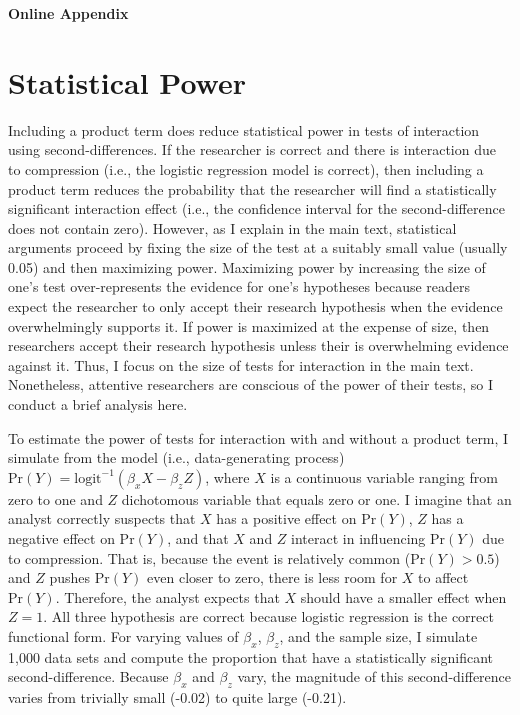 \documentclass[12pt]{article}
\begin{document}
\singlespace

%

\newpage
\begin{appendix}
\singlespace

\begin{center}
\LARGE{\textbf{Online Appendix}}\vspace{4mm}
\end{center}
\section{Statistical Power}

Including a product term does reduce statistical power in tests of interaction using second-differences. If the researcher is correct and there is interaction due to compression (i.e., the logistic regression model is correct), then including a product term reduces the probability that the researcher will find a statistically significant interaction effect (i.e., the confidence interval for the second-difference does not contain zero). However, as I explain in the main text, statistical arguments proceed by fixing the size of the test at a suitably small value (usually 0.05) and then maximizing power. Maximizing power by increasing the size of one's test over-represents the evidence for one's hypotheses because readers expect the researcher to only accept their research hypothesis when the evidence overwhelmingly supports it. If power is maximized at the expense of size, then researchers accept their research hypothesis unless their is overwhelming evidence against it. Thus, I focus on the size of tests for interaction in the main text. Nonetheless, attentive researchers are conscious of the power of their tests, so I conduct a brief analysis here.

To estimate the power of tests for interaction with and without a product term, I simulate from the model (i.e., data-generating process) $\text{Pr}(Y) = \text{logit}^{-1}(\beta_xX - \beta_zZ)$, where $X$ is a continuous variable ranging from zero to one and $Z$ dichotomous variable that equals zero or one. I imagine that an analyst correctly suspects that $X$ has a positive effect on $\text{Pr}(Y)$, $Z$ has a negative effect on $\text{Pr}(Y)$, and that $X$ and $Z$ interact in influencing $\text{Pr}(Y)$ due to compression. That is, because the event is relatively common ($\text{Pr}(Y) > 0.5$) and $Z$ pushes $\text{Pr}(Y)$ even closer to zero, there is less room for $X$ to affect $\text{Pr}(Y)$. Therefore, the analyst expects that $X$ should have a smaller effect when $Z=1$. All three hypothesis are correct because logistic regression is the correct functional form. For varying values of $\beta_x$, $\beta_z$, and the sample size, I simulate 1,000 data sets and compute the proportion that have a statistically significant second-difference. Because $\beta_x$ and $\beta_z$ vary, the magnitude of this second-difference varies from trivially small (-0.02) to quite large (-0.21).


\end{appendix}
\end{document}
